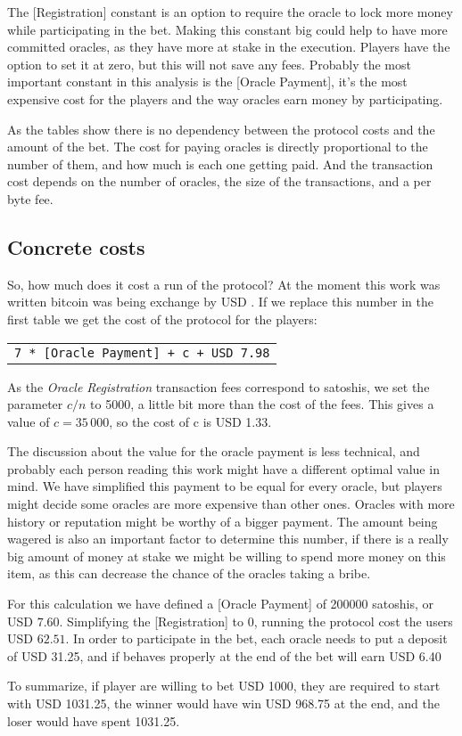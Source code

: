 The [Registration] constant is an option to require the oracle to lock more
  money while participating in the bet.
Making this constant big could help to have more committed oracles, as they
  have more at stake in the execution.
Players have the option to set it at zero, but this will not save any fees.
Probably the most important constant in this analysis is the [Oracle Payment],
  it's the most expensive cost for the players and the way oracles earn money
  by participating.

As the tables show there is no dependency between the protocol costs and the
  amount of the bet.
The cost for paying oracles is directly proportional to the number of them, and
  how much is each one getting paid.
And the transaction cost depends on the number of oracles, the size of the
  transactions, and a per byte fee.

\subsection{Concrete costs}

So, how much does it cost a run of the protocol?
At the moment this work was written bitcoin was being exchange by USD
  \bitcoinusd{}.
If we replace this number in the first table we get the cost of the protocol for
  the players:
\begin{center}
    \begin{tabular}{|c|}
        \texttt{7 * [Oracle Payment] + c + USD 7.98}
    \end{tabular}
\end{center}

As the \textit{Oracle Registration} transaction fees correspond to
  \mbox{} satoshis, we set the parameter $c/n$ to 5000, a
  little bit more than the cost of the fees.
This gives a value of $c = 35\,000$, so the cost of c is USD 1.33.

The discussion about the value for the oracle payment is less technical, and
  probably each person reading this work might have a different optimal value
  in mind.
We have simplified this payment to be equal for every oracle, but players
  might decide some oracles are more expensive than other ones.
Oracles with more history or reputation might be worthy of a bigger payment.
The amount being wagered is also an important factor to determine this number,
  if there is a really big amount of money at stake we might be willing to
  spend more money on this item, as this can decrease the chance of the oracles
  taking a bribe.

For this calculation we have defined a [Oracle Payment] of \num{200000}
  satoshis, or USD $7.60$. Simplifying the [Registration] to 0, running the
  protocol cost the users USD $62.51$.
In order to participate in the bet, each oracle needs to put a deposit of
  USD 31.25, and if behaves properly at the end of the bet will earn USD 6.40

To summarize, if player are willing to bet USD 1000, they are required to start
  with USD 1031.25, the winner would have win USD 968.75 at the end, and the
  loser would have spent 1031.25.
